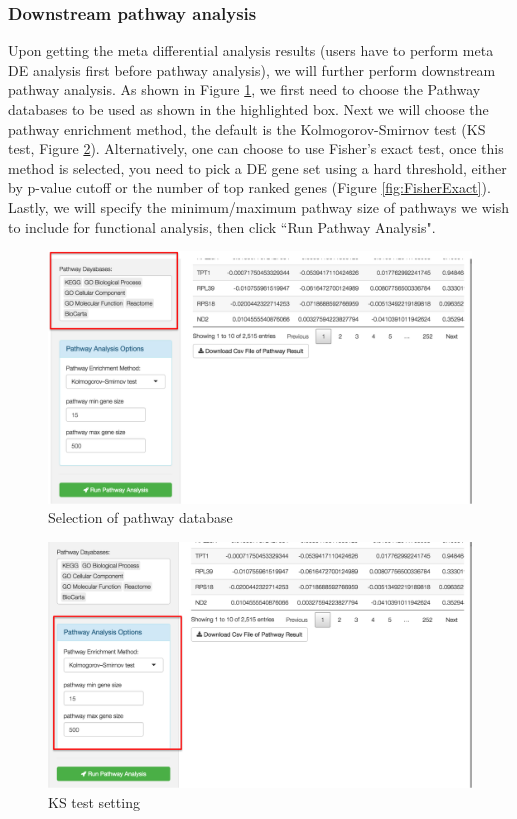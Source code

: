 \subsubsection{Downstream pathway analysis}

Upon getting the meta differential analysis results (users have to perform meta DE analysis first before pathway analysis), we will further perform downstream pathway analysis. As shown in Figure \ref{fig:PathwayDB}, we first need to choose the Pathway databases to be used as shown in the highlighted box. Next we will choose the pathway enrichment method, the default is the Kolmogorov-Smirnov test (KS test, Figure \ref{fig:KStest}). Alternatively, one can choose to use Fisher's exact test, once this method is selected, you need to pick a DE gene set using a hard threshold, either by p-value cutoff or the number of top ranked genes (Figure \ref{fig:FisherExact}). Lastly, we will specify the minimum/maximum pathway size of pathways we wish to include for functional analysis, then click ``Run Pathway Analysis".     

\begin{figure}[H]
\begin{center}
\includegraphics[scale=0.45]{./figure/metaDE/PathwayDB}
\caption{Selection of pathway database}
\label{fig:PathwayDB}
\end{center}
\end{figure}

\begin{figure}[H]
\begin{center}
\includegraphics[scale=0.45]{./figure/metaDE/KStest}
\caption{KS test setting}
\label{fig:KStest}
\end{center}
\end{figure}

